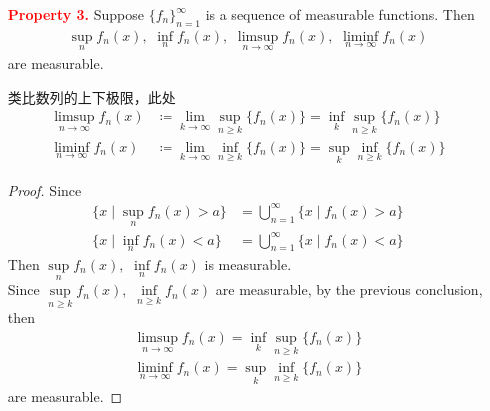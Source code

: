 \begin{enumerate}
\begin{proof}
\begin{enumerate}
				\item[(b)]$\forall O \underset{open}{\subset} \R$. Since $\Phi$ is continuous, then $\Phi^{-1}(O)$ is open.\\
				Since $f$ is finite-valued and measurable, then $(\Phi \circ f)^{-1}(O) = f^{-1}(\Phi^{-1}(O))$ is open.\\
				Therefore, by Property 1, $\Phi \circ f$ is measurable.
			\end{enumerate}
		\end{proof}
		
		\vspace{2em}
		\item[\textcolor{red}{\textbf{Property 3.}}]Suppose $\{ f_n \}_{n = 1}^{\infty}$ is a sequence of measurable functions. Then
		\begin{align}
			\sup_{n}{f_{n}(x)} , \,\, \inf_{n}{f_{n}(x)} , \,\, \limsup_{n \to \infty}{f_{n}(x)} , \,\, \liminf_{n \to \infty}{f_{n}(x)}
		\end{align}
		are measurable.
		
		\begin{rmk}
			类比数列的上下极限，此处
			\begin{align}
				\limsup_{n \to \infty}{f_{n}(x)} &\coloneqq \lim_{k \to \infty}{\sup_{n \geq k}{\{ f_{n}(x) \}}} = \inf_{k}{\sup_{n \geq k}{\{ f_{n}(x) \}}} \\
				\liminf_{n \to \infty}{f_{n}(x)} &\coloneqq \lim_{k \to \infty}{\inf_{n \geq k}{\{ f_{n}(x) \}}} = \sup_{k}{\inf_{n \geq k}{\{ f_{n}(x) \}}}
			\end{align}
		\end{rmk}
		
		\vspace{2em}
		\begin{proof}
			Since
			\begin{align}
				\{ x \mid \sup_{n}{f_{n}(x)} > a \} &= \bigcup_{n = 1}^{\infty}{\{ x \mid f_{n}(x) > a \}} \\
				\{ x \mid \inf_{n}{f_{n}(x)} < a \} &= \bigcup_{n = 1}^{\infty}{\{ x \mid f_{n}(x) < a \}}
			\end{align}
			Then $\underset{n}{\sup}{f_{n}(x)} , \,\, \underset{n}{\inf}{f_{n}(x)}$ is measurable.\\
			Since $\underset{n \geq k}{\sup}{f_{n}(x)} , \,\, \underset{n \geq k}{\inf}{f_{n}(x)}$ are measurable, by the previous conclusion, then
			\begin{align}
				\limsup_{n \to \infty}{f_{n}(x)} = \inf_{k}{\sup_{n \geq k}{\{ f_{n}(x) \}}} \\
				\liminf_{n \to \infty}{f_{n}(x)} = \sup_{k}{\inf_{n \geq k}{\{ f_{n}(x) \}}}
			\end{align}
			are measurable.
		\end{proof}
	

\end{enumerate}
